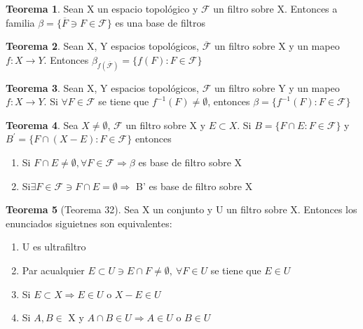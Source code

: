 \documentclass{article}
\theoremstyle{definition}
\newtheorem{theorem}{Teorema}[section]
\begin{document}
\begin{theorem}
	Sean X un espacio topológico y $\mathcal{F}$ un filtro sobre X. Entonces a familia $\beta=\{\overline{F}\ni F\in \mathcal{F}\}$ es una base de filtros
\end{theorem}


\begin{theorem}
	Sean X, Y espacios topológicos, $\overline{\mathcal{F}}$ un filtro sobre X y un mapeo $f:X\to Y$. Entonces $\beta_{f(\overline{\mathcal{F}})}=\{f(F):F\in \mathcal{F}\}$
\end{theorem}


\begin{theorem}
	Sean X, Y espacios topológicos, $\mathcal{F}$ un filtro sobre Y y un mapeo $f:X\to Y$. Si $\forall F\in \mathcal{F}$ se tiene que $f^{-1}(F)\neq\emptyset$, entonces $\beta=\{f^{-1}(F):F\in \mathcal{F}\}$
\end{theorem}


\begin{theorem}
	Sea $X\neq\emptyset$, $\mathcal{F}$ un filtro sobre X y $E\subset X$. Si $B=\{F\cap E: F\in \mathcal{F}\}$ 
y $B^{'}=\{F\cap (X-E): F\in \mathcal{F}\}$ entonces 
	\begin{enumerate}
		\item Si $F\cap E\neq \emptyset, \forall F\in \mathcal{F}\Rightarrow \beta$ es base de filtro sobre X
		\item Si$\exists F\in \mathcal{F}\ni F\cap E = \emptyset \Rightarrow$ B' es base de filtro sobre X 
	\end{enumerate}
\end{theorem}


\begin{theorem}[Teorema 32]
	Sea X un conjunto y U un filtro sobre X. Entonces los enunciados siguietnes son equivalentes:
	\begin{enumerate}
		\item U es ultrafiltro
		\item Par acualquier $E\subset U\ni E\cap F\neq \emptyset,\ \forall F\in U$ se tiene que $E\in U$
		\item Si $E\subset X\Rightarrow E\in U$ o $X-E\in U$
		\item Si $A, B\in$ X y $ A\cap B\in U\Rightarrow A\in U$ o $ B\in U$
	\end{enumerate}
\end{theorem}
\end{document}
